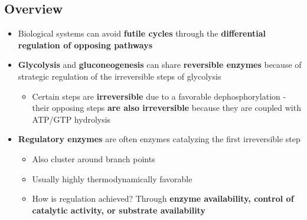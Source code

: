 \documentclass[10pt]{article}
\begin{document}
\subsection*{Overview}
\begin{itemize}
	\item Biological systems can avoid \textbf{futile cycles} through the \textbf{differential regulation of opposing pathways}
	\item \textbf{Glycolysis} and \textbf{gluconeogenesis} can share \textbf{reversible enzymes} because of strategic regulation of the irreversible steps of glycolysis
	\begin{itemize}
        \item Certain steps are \textbf{irreversible} due to a favorable dephosphorylation - their opposing steps \textbf{are also irreversible} because they are coupled with ATP/GTP hydrolysis
    \end{itemize}
    \item \textbf{Regulatory enzymes} are often enzymes catalyzing the first irreversible step
    \begin{itemize}
        \item Also cluster around branch points
        \item Usually highly thermodynamically favorable
        \item How is regulation achieved?  Through \textbf{enzyme availability, control of catalytic activity, or substrate availability}
    \end{itemize}
\end{itemize}
\end{document}
